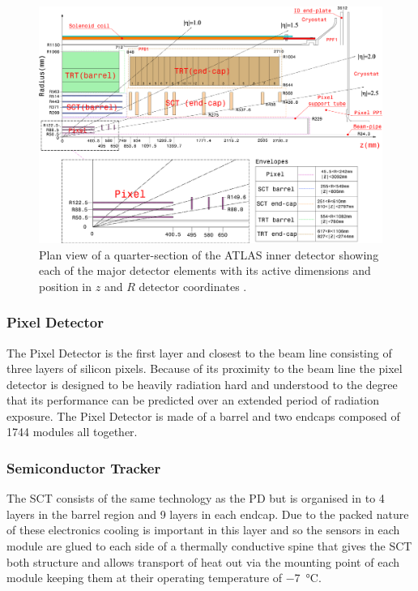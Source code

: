 		\begin{figure}[h!]
			\begin{center}
				\includegraphics[width=0.99\linewidth]{images/FigID26-mod-011107.eps}
			\end{center}
			\caption{Plan view of a quarter-section of the ATLAS inner detector showing each of the major detector elements with its active dimensions and position in $z$ and $R$ detector coordinates \cite{Aad:1129811}.}
			\label{fig:ATLAS_inner_config}
		\end{figure}



		\subsubsection*{Pixel Detector} 

		The Pixel Detector is the first layer and closest to the beam line consisting of three layers of silicon pixels. Because of its proximity to the beam line the pixel detector is designed to be heavily radiation hard and understood to the degree that its performance can be predicted over an extended period of radiation exposure. The Pixel Detector is made of a barrel and two endcaps composed of 1744 modules all together. 


		\subsubsection*{Semiconductor Tracker}

		The SCT consists of the same technology as the PD but is organised in to 4 layers in the barrel region and 9 layers in each endcap. Due to the packed nature of these electronics cooling is important in this layer and so the sensors in each module are glued to each side of a thermally conductive spine that gives the SCT both structure and allows transport of heat out via the mounting point of each module keeping them at their operating temperature of \SI{-7}{\degreeCelsius}.



